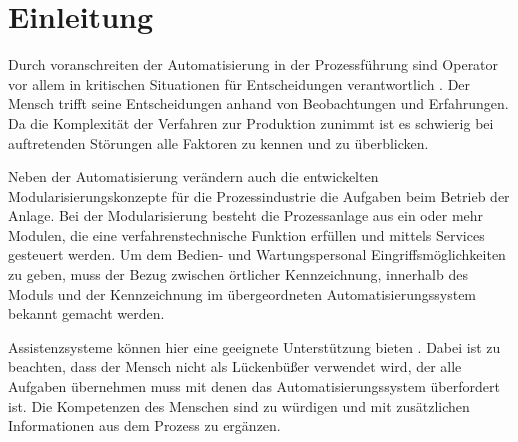 
\chapter{Einleitung}
\label{sec:Einleitung}

Durch voranschreiten der Automatisierung in der Prozessführung sind Operator vor allem in kritischen Situationen für Entscheidungen verantwortlich \cite{Bainbridge1983}. Der Mensch trifft seine Entscheidungen anhand von Beobachtungen und Erfahrungen. Da die Komplexität der Verfahren zur Produktion zunimmt ist es schwierig bei auftretenden Störungen alle Faktoren zu kennen und zu überblicken. 

Neben der Automatisierung verändern auch die entwickelten Modularisierungskonzepte für die Prozessindustrie die Aufgaben beim Betrieb der Anlage. Bei der Modularisierung besteht die Prozessanlage aus ein oder mehr Modulen, die eine verfahrenstechnische Funktion erfüllen und mittels Services gesteuert werden. \glqq Um dem Bedien- und Wartungspersonal Eingriffsmöglichkeiten zu geben, muss der Bezug zwischen örtlicher Kennzeichnung, innerhalb des Moduls und der Kennzeichnung im übergeordneten Automatisierungssystem bekannt gemacht werden.\grqq \ \cite{Obst2013} 

Assistenzsysteme können hier eine geeignete Unterstützung bieten \cite{Dalgleish2007} . Dabei ist zu beachten, dass der Mensch nicht als Lückenbüßer verwendet wird, der alle Aufgaben übernehmen muss mit denen das Automatisierungssystem überfordert ist. Die Kompetenzen des Menschen sind zu würdigen und mit zusätzlichen Informationen aus dem Prozess zu ergänzen. \cite{Weisner2018}


